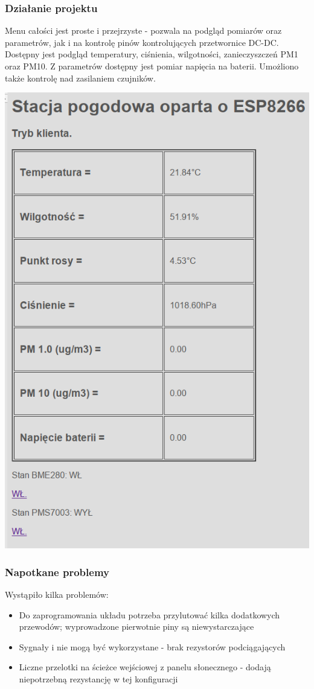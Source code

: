\documentclass{beamer}
\begin{document}
\begin{frame}
	\frametitle{Działanie projektu}
	Menu całości jest proste i przejrzyste - pozwala na podgląd pomiarów oraz parametrów, jak i na kontrolę pinów kontrolujących przetwornice DC-DC. Dostępny jest podgląd temperatury, ciśnienia, wilgotności, zanieczyszczeń PM1 oraz PM10. Z parametrów dostępny jest pomiar napięcia na baterii. Umożliono także kontrolę nad zasilaniem czujników.
			\begin{center}
		\includegraphics[scale=0.15]{img/app01.png}
	\end{center}
\end{frame}
\begin{frame}
\frametitle{Napotkane problemy}
	Wystąpiło kilka problemów:
	\begin{itemize}
		\item Do zaprogramowania układu potrzeba przylutować kilka dodatkowych przewodów; wyprowadzone pierwotnie piny są niewystarczające
		\item Sygnały  i  nie mogą być wykorzystane - brak rezystorów podciągających
		\item Liczne przelotki na ścieżce wejściowej z panelu słonecznego - dodają niepotrzebną rezystancję w tej konfiguracji
	\end{itemize}
\end{frame}
\end{document}

